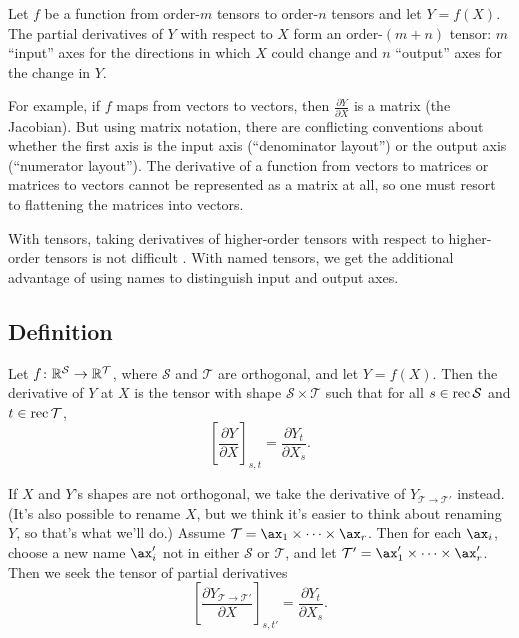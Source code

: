 \newcommand{\ddx}[1]{\frac{\partial #1}{\partial X}}

Let $f$ be a function from order-$m$ tensors to order-$n$ tensors and let $Y = f(X)$. The partial derivatives of $Y$ with respect to $X$ form an order-$(m+n)$ tensor: $m$ ``input'' axes for the directions in which $X$ could change and $n$ ``output'' axes for the change in $Y$.

For example, if $f$ maps from vectors to vectors, then $\ddx Y$ is a matrix (the Jacobian). But using matrix notation, there are conflicting conventions about whether the first axis is the input axis (``denominator layout'') or the output axis (``numerator layout''). The derivative of a function from vectors to matrices or matrices to vectors cannot be represented as a matrix at all, so one must resort to flattening the matrices into vectors.

With tensors, taking derivatives of higher-order tensors with respect to higher-order tensors is not difficult \citep{laue+:2018}. With named tensors, we get the additional advantage of using names to distinguish input and output axes.

\subsection{Definition}

Let $f \colon \mathbb{R}^\mathcal{S} \rightarrow \mathbb{R}^\mathcal{T}$, where $\mathcal{S}$ and $\mathcal{T}$ are orthogonal, and let $Y = f(X)$. Then the derivative of $Y$ at $X$ is the tensor with shape $\mathcal{S} \times \mathcal{T}$ such that for all $s \in \operatorname{rec}\mathcal{S}$ and $t \in \operatorname{rec}\mathcal{T}$,
\begin{equation*}
  \left[\ddx Y \right]_{s,t} = \frac{\partial Y_t}{\partial X_s}.
\end{equation*}

If $X$ and $Y$'s shapes are not orthogonal, we take the derivative of $Y_{\mathcal{T}\rightarrow\mathcal{T'}}$ instead. (It's also possible to rename $X$, but we think it's easier to think about renaming $Y$, so that's what we'll do.) Assume $\mathcal{T} = \ax_1 \times \cdots \times \ax_r$. Then for each $\ax_i$, choose a new name $\ax_i'$ not in either $\mathcal{S}$ or $\mathcal{T}$, and let $\mathcal{T'} = \ax_1' \times \cdots \times \ax_r'$. Then we seek the tensor of partial derivatives
\begin{equation*}
  \left[\ddx{Y_{\mathcal{T}\rightarrow\mathcal{T'}}} \right]_{s,t'} = \frac{\partial Y_t}{\partial X_s}.
\end{equation*}

